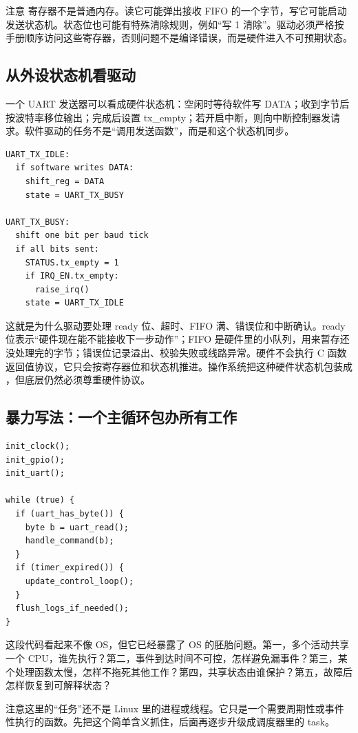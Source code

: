 注意  寄存器不是普通内存。读它可能弹出接收 FIFO 的一个字节，写它可能启动发送状态机。状态位也可能有特殊清除规则，例如“写 1 清除”。驱动必须严格按手册顺序访问这些寄存器，否则问题不是编译错误，而是硬件进入不可预期状态。

\subsection{从外设状态机看驱动}

一个 UART 发送器可以看成硬件状态机：空闲时等待软件写 DATA；收到字节后按波特率移位输出；完成后设置 tx\_empty；若开启中断，则向中断控制器发请求。软件驱动的任务不是“调用发送函数”，而是和这个状态机同步。

\begin{lstlisting}
UART_TX_IDLE:
  if software writes DATA:
    shift_reg = DATA
    state = UART_TX_BUSY

UART_TX_BUSY:
  shift one bit per baud tick
  if all bits sent:
    STATUS.tx_empty = 1
    if IRQ_EN.tx_empty:
      raise_irq()
    state = UART_TX_IDLE
\end{lstlisting}

这就是为什么驱动要处理 ready 位、超时、FIFO 满、错误位和中断确认。ready 位表示“硬件现在能不能接收下一步动作”；FIFO 是硬件里的小队列，用来暂存还没处理完的字节；错误位记录溢出、校验失败或线路异常。硬件不会执行 C 函数返回值协议，它只会按寄存器位和状态机推进。操作系统把这种硬件状态机包装成 ，但底层仍然必须尊重硬件协议。

\subsection{暴力写法：一个主循环包办所有工作}

\begin{lstlisting}
init_clock();
init_gpio();
init_uart();

while (true) {
  if (uart_has_byte()) {
    byte b = uart_read();
    handle_command(b);
  }
  if (timer_expired()) {
    update_control_loop();
  }
  flush_logs_if_needed();
}
\end{lstlisting}

这段代码看起来不像 OS，但它已经暴露了 OS 的胚胎问题。第一，多个活动共享一个 CPU，谁先执行？第二，事件到达时间不可控，怎样避免漏事件？第三，某个处理函数太慢，怎样不拖死其他工作？第四，共享状态由谁保护？第五，故障后怎样恢复到可解释状态？

注意这里的“任务”还不是 Linux 里的进程或线程。它只是一个需要周期性或事件性执行的函数。先把这个简单含义抓住，后面再逐步升级成调度器里的 task。

